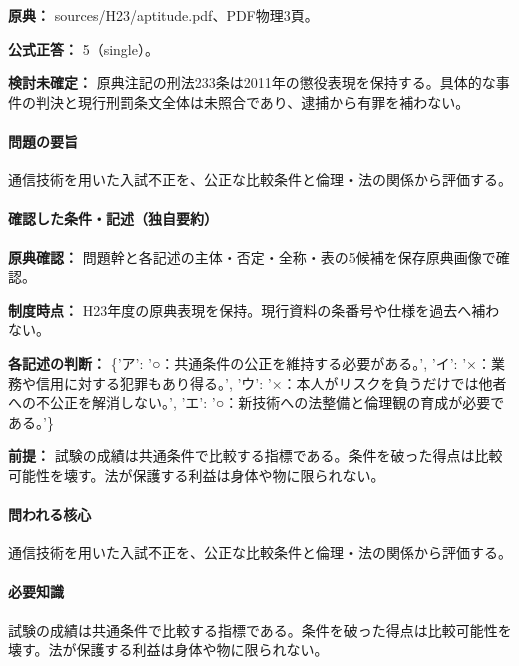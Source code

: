 \noindent\textbf{原典：} sources/H23/aptitude.pdf、PDF物理3頁。

\textbf{公式正答：} 5（single）。

\par\textbf{検討未確定：} 原典注記の刑法233条は2011年の懲役表現を保持する。具体的な事件の判決と現行刑罰条文全体は未照合であり、逮捕から有罪を補わない。

\paragraph{問題の要旨} 通信技術を用いた入試不正を、公正な比較条件と倫理・法の関係から評価する。

\paragraph{確認した条件・記述（独自要約）}\mbox{}\par

\noindent\textbf{原典確認：} 問題幹と各記述の主体・否定・全称・表の5候補を保存原典画像で確認。\par

\noindent\textbf{制度時点：} H23年度の原典表現を保持。現行資料の条番号や仕様を過去へ補わない。\par

\noindent\textbf{各記述の判断：} \{'ア': '○：共通条件の公正を維持する必要がある。', 'イ': '×：業務や信用に対する犯罪もあり得る。', 'ウ': '×：本人がリスクを負うだけでは他者への不公正を解消しない。', 'エ': '○：新技術への法整備と倫理観の育成が必要である。'\}\par

\noindent\textbf{前提：} 試験の成績は共通条件で比較する指標である。条件を破った得点は比較可能性を壊す。法が保護する利益は身体や物に限られない。\par

\paragraph{問われる核心} 通信技術を用いた入試不正を、公正な比較条件と倫理・法の関係から評価する。

\paragraph{必要知識} 試験の成績は共通条件で比較する指標である。条件を破った得点は比較可能性を壊す。法が保護する利益は身体や物に限られない。

